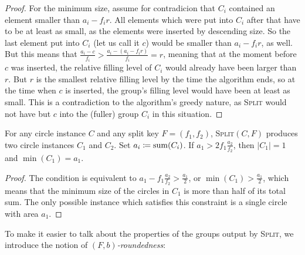 \documentclass[a4paper,style=print,bibliography=totoc,nexus,lnum,extramargin]{tubsbook}
\begin{document}
\begin{proof}
    For the minimum size, assume for contradicion that $C_i$ contained an element smaller than $a_i - f_i r$. All elements which were put into $C_i$ after that have to be at least as small, as the elements were inserted by descending size. So the last element put into $C_i$ (let us call it $c$) would be smaller than $a_i - f_i r$, as well.
    But this means that $\frac{a_i - c}{f_i} > \frac{a_i - (a_i - f_i r)}{f_i} = r$, meaning that at the moment before $c$ was inserted, the relative filling level of $C_i$ would already have been larger than $r$. But $r$ is the smallest relative filling level by the time the algorithm ends, so at the time when $c$ is inserted, the group's filling level would have been at least as small.
    This is a contradiction to the algorithm's greedy nature, as \textsc{Split} would not have but $c$ into the (fuller) group $C_i$ in this situation.
\end{proof}

\begin{lemma}
    For any circle instance $C$ and any split key $F = (f_1, f_2)$, \textsc{Split}$(C,F)$ produces two circle instances $C_1$ and $C_2$. Set $a_i \coloneqq \operatorname{sum}(C_i)$.
    If $a_1 > 2 f_1 \frac{a_2}{f_2}$, then $|C_1| = 1$ and $\min(C_1) = a_1$.
\end{lemma}

\begin{proof}
    The condition is equivalent to $a_1 - f_1 \frac{a_2}{f_2} > \frac{a_1}{2}$, or $\min(C_1) > \frac{a_1}{2}$, which means that the minimum size of the circles in $C_1$ is more than half of its total sum. The only possible instance which satisfies this constraint is a single circle with area $a_1$.
\end{proof}

To make it easier to talk about the properties of the groups output by \textsc{Split}, we introduce the notion of \emph{$(F,b)$-roundedness}:

\end{document}
